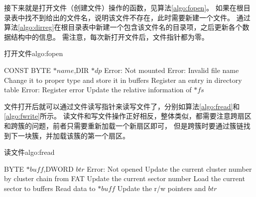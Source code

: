 接下来就是打开文件（创建文件）操作的函数，见算法\ref{algo:fopen}。
如果在根目录表中找不到给出的文件名，说明该文件不存在，此时需要新建一个文件。
通过算法\ref{algo:dirreg}在根目录表中新建一个包含该文件名的目录项，之后更新各个数据结构中的信息。
需注意，每次新打开文件后，文件指针都为零。
\begin{balgo}{打开文件}{algo:fopen}
\begin{algorithmic}[1]
\Require CONST BYTE $*name$,\quad DIR $*dp$
    \State \Return Error: Not mounted
\EndIf
{}
    \State \Return Error: Invalid file name
\Else
    \State Change it to proper type and store it in buffers 
\EndIf
{}
    \State Register an entry in directory table
        \State \Return Error: Register error
    \EndIf
\EndIf
\State Update the relative information of $*fs$
\end{algorithmic}
\end{balgo}

文件打开后就可以通过文件读写指针来读写文件了，分别如算法\ref{algo:fread}和\ref{algo:fwrite}所示。
读文件和写文件操作正好相反，整体类似，都需要注意跨扇区和跨簇的问题，前者只需要重新加载一个新扇区即可，
但是跨簇时要通过簇链找到下一块簇，并加载该簇的第一个扇区。
\begin{balgo}{读文件}{algo:fread}
\begin{algorithmic}[1]
\Require BYTE $*buff$,\quad DWORD $btr$ 
    \State \Return Error: Not opened
\EndIf
\Repeat
{}
        \State Update the current cluster number by cluster chain from FAT
    \Else
        \State Update the current sector number
    \EndIf
\EndIf
\State Load the current sector to buffers
\State Read data to $*buff$
\State Update the r/w pointers and $btr$
\end{algorithmic}
\end{balgo}


